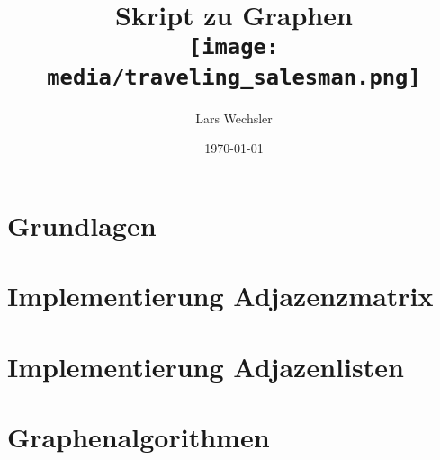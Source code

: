 \documentclass{article}
\author{Lars Wechsler}
\title{Skript zu Graphen \\ \centering\texttt{[image: media/traveling\_salesman.png]}}
\date{\today}
\begin{document}
\maketitle
\newpage
\tableofcontents
\newpage 

\section{Grundlagen}



\newpage

\section{Implementierung Adjazenzmatrix}


\newpage

\section{Implementierung Adjazenlisten}


\newpage 

\section{Graphenalgorithmen}

\end{document}
